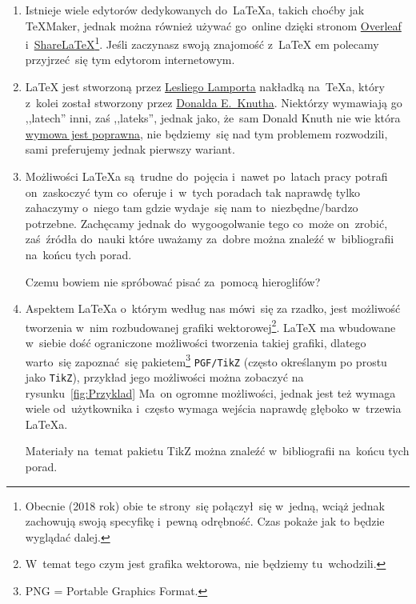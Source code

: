 \documentclass[a4paper,11pt]{article}
\begin{document}
\begin{enumerate}
\item Istnieje wiele edytorów dedykowanych do~\LaTeX a, takich choćby
  jak \TeX Maker, jednak można również używać go~online dzięki stronom
  \href{https://www.overleaf.com/}{Overleaf}
  i~\href{https://www.sharelatex.com/}{Share\LaTeX}\footnote{Obecnie
    (2018 rok) obie te strony~się połączył~się w~jedną, wciąż jednak
    zachowują swoją specyfikę i~pewną odrębność. Czas pokaże jak to
    będzie wyglądać dalej.}. Jeśli zaczynasz swoją znajomość z~\LaTeX
  em polecamy przyjrzeć~się tym edytorom internetowym.

\item \LaTeX{} jest stworzoną przez
  \href{https://en.wikipedia.org/wiki/Leslie_Lamport}{Lesliego
    Lamporta} nakładką na~\TeX a, który z~kolei został stworzony przez
  \href{https://en.wikipedia.org/wiki/Donald_Knuth}{Donalda
    E.~Knutha}. Niektórzy wymawiają go ,,latech'' inni, zaś
  ,,lateks'', jednak jako, że~sam Donald Knuth nie wie która
  \href{https://www.youtube.com/watch?v=8HuwiBPLV3A}{wymowa jest
    poprawna}, nie będziemy~się nad tym problemem rozwodzili, sami
  preferujemy jednak pierwszy wariant.

\item Możliwości \LaTeX a są~trudne do~pojęcia i~nawet po~latach pracy
  potrafi on~zaskoczyć tym co~oferuje i~w~tych poradach tak naprawdę
  tylko zahaczymy o~niego tam gdzie wydaje~się nam to~niezbędne/bardzo
  potrzebne. Zachęcamy jednak do~wygoogolwanie tego co~może on~zrobić,
  zaś~źródła do~nauki które uważamy za~dobre można znaleźć
  w~bibliografii na~końcu tych porad.

  Czemu bowiem nie spróbować pisać za~pomocą hieroglifów?

\item Aspektem \LaTeX a o~którym według nas mówi~się za rzadko, jest
  możliwość tworzenia w~nim rozbudowanej grafiki
  wektorowej\footnote{W~temat tego czym jest grafika wektorowa, nie
    będziemy tu~wchodzili.}. \LaTeX{} ma wbudowane w~siebie dość
  ograniczone możliwości tworzenia takiej grafiki, dlatego warto~się
  zapoznać~się pakietem\footnote{PNG = Portable Graphics Format.}
  \texttt{PGF/TikZ} (często określanym po prostu jako \texttt{TikZ}),
  przykład jego możliwości można zobaczyć na
  rysunku~\eqref{fig:Przyklad} Ma~on ogromne możliwości, jednak jest
  też wymaga wiele od~użytkownika i~często wymaga wejścia naprawdę
  głęboko w~trzewia \LaTeX a.

  Materiały na~temat pakietu TikZ można znaleźć w~bibliografii
  na~końcu tych porad.
\end{enumerate}
\end{document}
